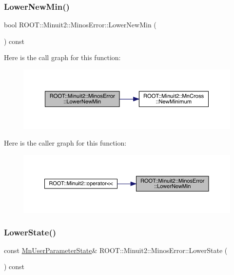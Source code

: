 \subsubsection{\texorpdfstring{LowerNewMin()}{LowerNewMin()}\hspace{0.1cm}{\footnotesize\ttfamily [3/3]}}
{\footnotesize\ttfamily bool R\+O\+O\+T\+::\+Minuit2\+::\+Minos\+Error\+::\+Lower\+New\+Min (\begin{DoxyParamCaption}{ }\end{DoxyParamCaption}) const\hspace{0.3cm}{\ttfamily [inline]}}

Here is the call graph for this function\+:
\nopagebreak
\begin{figure}[H]
\begin{center}
\leavevmode
\includegraphics[width=350pt]{d2/dd1/classROOT_1_1Minuit2_1_1MinosError_a9a806056992d1acb26420bf4895b46e9_cgraph}
\end{center}
\end{figure}
Here is the caller graph for this function\+:
\nopagebreak
\begin{figure}[H]
\begin{center}
\leavevmode
\includegraphics[width=350pt]{d2/dd1/classROOT_1_1Minuit2_1_1MinosError_a9a806056992d1acb26420bf4895b46e9_icgraph}
\end{center}
\end{figure}
\mbox{\label{classROOT_1_1Minuit2_1_1MinosError_ac10a407a1cb13f4e0c1b4d21383d15df}} 
\subsubsection{\texorpdfstring{LowerState()}{LowerState()}\hspace{0.1cm}{\footnotesize\ttfamily [1/3]}}
{\footnotesize\ttfamily const \mbox{\hyperlink{classROOT_1_1Minuit2_1_1MnUserParameterState}{Mn\+User\+Parameter\+State}}\& R\+O\+O\+T\+::\+Minuit2\+::\+Minos\+Error\+::\+Lower\+State (\begin{DoxyParamCaption}{ }\end{DoxyParamCaption}) const\hspace{0.3cm}{\ttfamily [inline]}}

